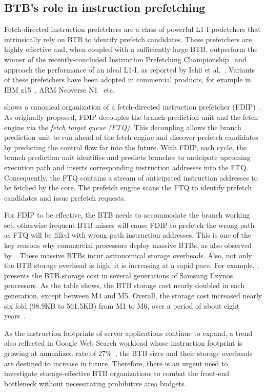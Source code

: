 \subsection{BTB's role in instruction prefetching}
Fetch-directed instruction prefetchers are a class of powerful L1-I prefetchers that intrinsically rely on BTB to identify prefetch candidates. 
These prefetchers are highly effective and, when coupled with a sufficiently large BTB, outperform the winner of the recently-concluded Instruction Prefetching Championship~\cite{ipc1} and approach the performance of an ideal L1-I, as reported by Ishii et al.~\cite{rebase}. Variants of these prefetchers have been adopted in commercial products, for example in IBM z15~\cite{IBMz15HotChips}, ARM Neoverse N1~\cite{neoverse} etc.

 shows a canonical organization of a fetch-directed instruction prefetcher (FDIP)~\cite{fdip}. 
As originally proposed, FDIP decouples the branch-prediction unit and the fetch engine via the {\em fetch target queue (FTQ)}. This decoupling allows the branch prediction unit to run ahead of the fetch engine and discover prefetch candidates by predicting the control flow far into the future. With FDIP, each cycle, the branch prediction unit identifies and predicts branches to anticipate upcoming execution path and inserts corresponding instruction addresses into the FTQ. Consequently, the FTQ contains a stream of anticipated instruction addresses to be fetched by the core. The prefetch engine scans the FTQ to identify prefetch candidates and issue prefetch requests. 

For FDIP to be effective, the BTB needs to accommodate the branch working set, otherwise frequent BTB misses will cause FDIP to prefetch the wrong path as FTQ will be filled with wrong path instruction addresses. This is one of the key reasons why commercial processors deploy massive BTBs, as also observed by~\cite{rebase}. These massive BTBs incur astronomical storage overheads. Also, not only the BTB storage overhead is high, it is increasing at a rapid pace. For example, , presents the BTB storage cost in several generations of Samsung Exynos processors. As the table shows, the BTB storage cost nearly doubled in each generation, except between M4 and M5. Overall, the storage cost increased nearly six fold (98.9KB to 561.5KB) from M1 to M6, over a period of about eight years~\cite{exynos}.

As the instruction footprints of server applications continue to expand, a trend also reflected in Google Web Search workload whose instruction footprint is growing at annualized rate of 27\%~\cite{profileWarehouse}, the BTB sizes and their storage overheads are destined to increase in future. Therefore, there is an urgent need to investigate storage-effective BTB organizations to combat the front-end bottleneck without necessitating prohibitive area budgets.

